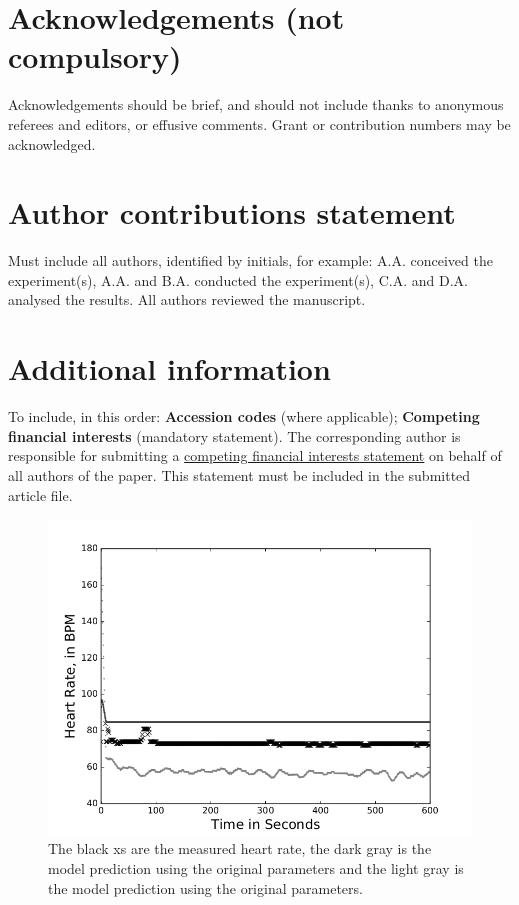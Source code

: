 \documentclass[fleqn,10pt]{wlscirep}
\begin{document}
\section*{Acknowledgements (not compulsory)}
Acknowledgements should be brief, and should not include thanks to anonymous referees and editors, or effusive comments. Grant or contribution numbers may be acknowledged.
\section*{Author contributions statement}
Must include all authors, identified by initials, for example:
A.A. conceived the experiment(s),  A.A. and B.A. conducted the experiment(s), C.A. and D.A. analysed the results.  All authors reviewed the manuscript. 
\section*{Additional information}
To include, in this order: \textbf{Accession codes} (where applicable); \textbf{Competing financial interests} (mandatory statement). 
The corresponding author is responsible for submitting a \href{http://www.nature.com/srep/policies/index.html#competing}{competing financial interests statement} on behalf of all authors of the paper. This statement must be included in the submitted article file.

\begin{figure}[ht]
                \centering
        \includegraphics[width=\linewidth]{figures/paramscomparisons28611-3108-03-06-18-24n}
       \caption{The black xs are the measured heart rate, the dark gray is the model prediction using the original parameters and the light gray is the model prediction using the original parameters.}
       \label{fig:paramscomparsion}
\end{figure}
\end{document}
